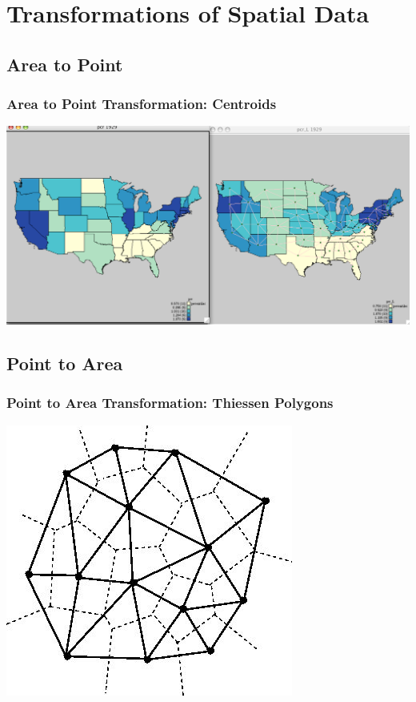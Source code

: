 \documentclass[nototal,handout]{beamer}
\begin{document}
\section{Transformations of Spatial Data}
\subsection{Area to Point}
\begin{frame}
  \frametitle{Area to Point Transformation: Centroids}
    \begin{center}
      \includegraphics[width=.65\linewidth]{area2point}
    \end{center}
  \end{frame}

\subsection{Point to Area}
\begin{frame}
  \frametitle{Point to Area Transformation: Thiessen Polygons}
    \begin{center}
      \includegraphics[width=.65\linewidth]{dt.jpg}
    \end{center}
  \end{frame}
\end{document}
